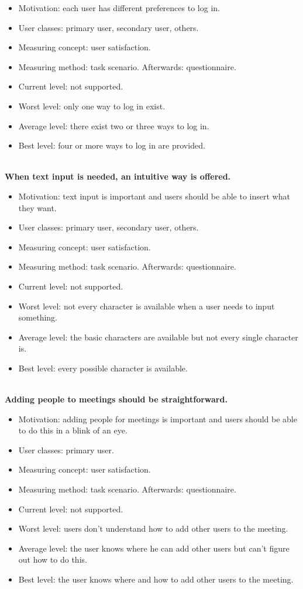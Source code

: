 \documentclass[11pt, a4paper,svglistings]{report}
\begin{document}
\begin{itemize}
\item{Motivation: each user has different preferences to log in.}
\item{User classes: primary user, secondary user, others.}
\item{Measuring concept: user satisfaction.}
\item{Measuring method: task scenario. Afterwards: questionnaire.}
\item{Current level: not supported.}
\item{Worst level: only one way to log in exist.}
\item{Average level: there exist two or three ways to log in.}
\item{Best level: four or more ways to log in are provided. \\ \\}
\end{itemize}
\textbf{When text input is needed, an intuitive way is offered.}
\begin{itemize}
\item{Motivation: text input is important and users should be able to insert what they want.}
\item{User classes: primary user, secondary user, others.}
\item{Measuring concept: user satisfaction.}
\item{Measuring method: task scenario. Afterwards: questionnaire.}
\item{Current level: not supported.}
\item{Worst level: not every character is available when a user needs to input something.}
\item{Average level: the basic characters are available but not every single character is.}
\item{Best level: every possible character is available. \\ \\}
\end{itemize}
\textbf{Adding people to meetings should be straightforward.}
\begin{itemize}
\item{Motivation: adding people for meetings is important and users should be able to do this in a blink of an eye.}
\item{User classes: primary user.}
\item{Measuring concept: user satisfaction.}
\item{Measuring method: task scenario. Afterwards: questionnaire.}
\item{Current level: not supported.}
\item{Worst level: users don't understand how to add other users to the meeting.}
\item{Average level: the user knows where he can add other users but can't figure out how to do this.}
\item{Best level: the user knows where and how to add other users to the meeting. \\ \\}
\end{itemize}
\end{document}
